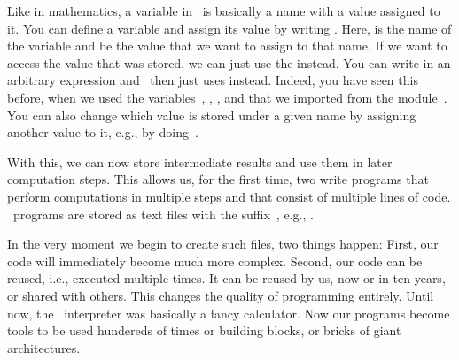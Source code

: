 %
%
%
Like in mathematics, a variable in \python\ is basically a name with a value assigned to it.
You can define a variable and assign its value by writing .
Here,  is the name of the variable and  be the value that we want to assign to that name.
If we want to access the value that was stored, we can just use the  instead.
You can write  in an arbitrary expression and \python\ then just uses  instead.
Indeed, you have seen this before, when we used the variables~, , , and  that we imported from the module~.
You can also change which value is stored under a given name by assigning another value to it, e.g., by doing~.

With this, we can now store intermediate results and use them in later computation steps.
This allows us, for the first time, two write programs that perform computations in multiple steps and that consist of multiple lines of code.
\python\ programs are stored as text files with the suffix~, e.g., .

In the very moment we begin to create such files, two things happen:
First, our code will immediately become much more complex.
Second, our code can be reused, i.e., executed multiple times.
It can be reused by us, now or in ten years, or shared with others.
This changes the quality of programming entirely.
Until now, the \python\ interpreter was basically a fancy calculator.
Now our programs become tools to be used hundereds of times or building blocks, or bricks of giant architectures.

